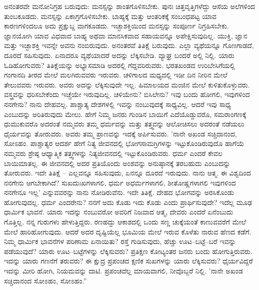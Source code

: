 ಅನಂತರವೇ ಮನೋನಿಗ್ರಹ ಬರುವುದು: ಮನಸ್ಸನ್ನು ಶಾಂತಗೊಳಿಸಬೇಕು. ಪುನಃ ಚಿತ್ತವೃತ್ತಿಗಳೆದ್ದು ಆಸೆಯ ಅಲೆಗಳಿಂದ ತುಂಬಕೂಡದು. ಮನಸ್ಸನ್ನು ಏಕಾಗ್ರಗೊಳಿಸಬೇಕು. ಬಾಹ್ಯಕ್ಕೆ ಮತ್ತು ಆಂತರಿಕಕ್ಕೆ ಸಂಬಂಧಪಟ್ಟ ಯಾವ ಕಾರಣಗಳಿಂದಲೂ ಅದು ಪ್ರಕ್ಷುಬ್ದ ವಾಗಕೂಡದು. ಇಚ್ಛಾಶಕ್ತಿಯಿಂದ ಮನಸ್ಸನ್ನು ಸಂಪೂರ್ಣ ನಿಗ್ರಹಿಸಬೇಕು. ಜ್ಞಾನಯೋಗಿ ಯಾವ ವಿಧವಾದ ಬಾಹ್ಯ ಅಥವಾ ಮಾನಸಿಕವಾದ ಸಹಾಯವನ್ನೂ ಅಪೇಕ್ಷಿಸುವುದಿಲ್ಲ. ಯುಕ್ತಿ, ಜ್ಞಾನ ಮತ್ತು ಇಚ್ಛಾಶಕ್ತಿ ಇವನ್ನೇ ಅವನು ನಂಬಿರುವುದು. ಅನಂತರವೆ ತಿತಿಕ್ಷೆ ಬರುವುದು. ಎಲ್ಲಾ ವ್ಯಥೆಯನ್ನೂ ಗೊಣಗಾಡದೆ, ದೂರದೆ ಸಹಿಸುವುದು. ಏನಾದರೂ ವ್ಯಥೆಯಾದರೆ ಅದನ್ನು ಲೆಕ್ಕಿಸಬೇಡಿ. ವ್ಯಾಘ್ರ ಬಂದರೆ ಅಲ್ಲಿ ನಿಲ್ಲಿ. ಯಾರು ಓಡಿಹೋಗುವರು? ತಿತಿಕ್ಷೆಯನ್ನು ಅಭ್ಯಾಸಮಾಡಿ ಅದರಲ್ಲಿ ಗೆದ್ದವರಿರುವರು. ಭರತಖಂಡದ ಉರಿಬೇಸಿಗೆಯಲ್ಲಿ ಗಂಗಾನದಿ ತೀರದ ಮೇಲೆ ಮಲಗಿರುವವರು ಇರುವರು. ಚಳಿಗಾಲದ ಮಧ್ಯದಲ್ಲಿ ಇಡೀ ದಿನ ನೀರಿನ ಮೇಲೆ ತೇಲುವವರು ಇರುವರು. ಅವರು ಅದನ್ನು ಲೆಕ್ಕಿಸುವುದೇ ಇಲ್ಲ. ಹಿಮಾಲಯದ ಮಂಜಿನ ಮೇಲೆ ಕುಳಿತುಕೊಳ್ಳುವರು. ವಸ್ತ್ರವನ್ನು ಧರಿಸಬೇಕೆಂದು ಇಚ್ಚೆಯೇ ಇರುವುದಿಲ್ಲ. ಚಳಿಯೇನು? ಬಿಸಿಲೇನು? ಇವು ಬಂದು ಹೋಗಲಿ, ಇವುಗಳಿಂದ ನನಗೇನು? ನಾನು ದೇಹವಲ್ಲ. ಪಾಶ್ಚಾತ್ಯ ದೇಶಗಳಲ್ಲಿ ಇವನ್ನು ನಂಬುವುದಕ್ಕೆ ಸಾಧ್ಯವಿಲ್ಲ. ಆದರೆ ಇವು ಸಾಧ್ಯ ಎಂಬುದನ್ನು ಅರಿತಿರುವುದು ಮೇಲು. ಹೇಗೆ ನಿಮ್ಮ ಜನರು ಗುಂಡಿನ ಬಾಯಿಗೆ ಎದೆಯೊಡ್ಡುವರೊ, ಸಮರಾಂಗಣಕ್ಕೆ ಧುಮುಕುವರೊ ಅದರಂತೆ ನಮ್ಮವರು ತಮ್ಮ ಧರ್ಮವನ್ನು ಮತ್ತು ತತ್ತ್ವವನ್ನು ಆಲೋಚಿಸಲು ಅದರಂತೆ ನಡೆಯಲು ಧೈರ್ಯವನ್ನು ತೋರುವರು. ಅವರು ತಮ್ಮ ಪ್ರಾಣವನ್ನು ಇದಕ್ಕೆ ಅರ್ಪಿಸುವರು. 'ನಾನೇ ಅಖಂಡ ಸಚ್ಚಿದಾನಂದ, ಸೋಽಹಂ. ಪಾಶ್ಚಾತ್ಯರ ಆದರ್ಶ ಹೇಗೆ ನಿತ್ಯ ಜೀವನದಲ್ಲಿ ಭೋಗಸಾಮಗ್ರಿಗಳನ್ನು ಇಟ್ಟುಕೊಂಡಿರುವುದೊ ಹಾಗೆಯೆ ನಮ್ಮವರು ಶ್ರೇಷ್ಠ ಆಧ್ಯಾತ್ಮಿಕ ತತ್ತ್ವಗಳನ್ನು ನಿತ್ಯಜೀವನದಲ್ಲಿ ಇಟ್ಟುಕೊಂಡಿರುವರು. ಧರ್ಮ ಎಂದರೆ ಕೇವಲ ಬಾಯಿಮಾತಲ್ಲ. ಈ ಜೀವನದಲ್ಲಿ ಅದರ ಪ್ರತಿಯೊಂದು ಅಂಶವನ್ನು ಅನುಷ್ಠಾನಕ್ಕೆ ತರಬಹುದು ಎಂಬುದನ್ನು ತೋರುವರು. ಇದೇ ತಿತಿಕ್ಷೆ – ಎಲ್ಲವನ್ನೂ ಸಹಿಸುವುದು, ಏನನ್ನೂ ದೂರದೆ ಇರುವುದು. ನಾನು ಆತ್ಮ. ಈ ವಿಶ್ವದಿಂದ ನನಗೇನು ಆಗಬೇಕಾಗಿದೆ? ಸುಖದುಃಖಗಳಾಗಲಿ, ಧರ್ಮ ಅಧರ್ಮಗಳಾಗಲಿ, ಶೀತೋಷ್ಣಗಳಾಗಲಿ ಇವುಗಳಿಂದ ನನಗೇನೂ ಇಲ್ಲ' ಎನ್ನುವವರನ್ನು ನಾನು ನೋಡಿರುವೆನು. ಇದೇ ತಿತಿಕ್ಷೆ. ದೇಹದ ಭೋಗವನ್ನು ಅರಸಿಕೊಂಡು ಹೋಗುವುದಲ್ಲ. ಧರ್ಮ ಎಂದರೇನು? ನನಗೆ ಅದು ಕೊಡು ಇದು ಕೊಡು ಎಂದು ಪ್ರಾರ್ಥಿಸುವುದೇ? ಇದೆಲ್ಲ ಮೂಢ ಧಾರ್ಮಿಕ ಭಾವನೆ. ಯಾರು ಇದನ್ನು ನಂಬುವರೋ ಅವರಿಗೆ ನಿಜವಾದ ಆತ್ಮ, ದೇವರು ಎಂದರೆ ಏನೆಂಬುದು ಗೊತ್ತಿಲ್ಲ. ನನ್ನ ಗುರುಗಳು ಹೇಳುತ್ತಿದ್ದರು. ರಣಹದ್ದು ಆಕಾಶದಲ್ಲಿ ಒಂದು ಸಣ್ಣ ಚುಕ್ಕೆಯಂತೆ ಕಾಣುವವರೆಗೆ ಮೇಲೆ ಮೇಲೆ ಹಾರಿಹೋಗುವುದು. ಆದರೆ ಅದರ ದೃಷ್ಟಿಯೆಲ್ಲ ಭೂಮಿಯ ಮೇಲೆ ಇರುವ ಕೊಳೆತು ನಾರುವ ಹೆಣದ ಕಡೆಗೆ. ನಿಮ್ಮ ಧಾರ್ಮಿಕ ಭಾವನೆಗಳ ಪರಿಣಾಮ ಏನಾಯಿತು? ರಸ್ತೆ ಗುಡಿಸುವುದು, ಹೆಚ್ಚು ಊಟ–ಬಟ್ಟೆ–ಬರೆ ಇವನ್ನು ಪಡೆಯುವುದೆ? ಯಾರು ಊಟ–ಬಟ್ಟೆಗಳನ್ನು ಲೆಕ್ಕಿಸುವರು? ಪ್ರತಿಕ್ಷಣ ಕೋಟ್ಯಂತರ ಜನರು ಬಂದು ಹೋಗುತ್ತಿರುವರು. ಇದನ್ನು ಯಾರು ಗಣನೆಗೆ ತರುವರು? ಈ ಕ್ಷುದ್ರ ಪ್ರಪಂಚದ ಕ್ಷಣಿಕ ಸುಖಗಳನ್ನು ಯಾರು ಲೆಕ್ಕಿಸುವರು? ಧೈರ್ಯವಿದ್ದರೆ ಇದನ್ನು ಮೀರಿ ಹೋಗಿ, ನಿಯಮವನ್ನು ದಾಟಿ. ಪ್ರಪಂಚವೆಲ್ಲ ಮಾಯವಾಗಲಿ, ನೀವೊಬ್ಬರೆ ನಿಲ್ಲಿ. 'ನಾನೇ ಅಖಂಡ ಸಚ್ಚಿದಾನಂದ ಸೋಽಹಂ, ಸೋಽಹಂ.”

